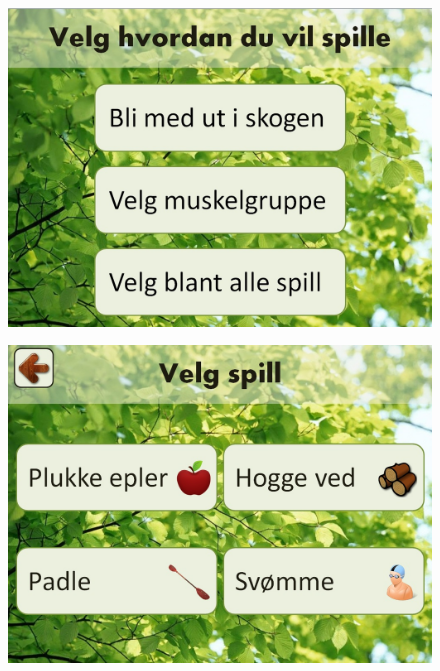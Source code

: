 \begin{figure} [H]
\centering
\includegraphics[scale=0.45]{menuStart.jpg}
\label{fig:menuStartNorsk}
\end{figure} 

\begin{figure} [H]
\centering
\includegraphics[scale=0.4]{VelgSpill.jpg}
\label{velgSpillNorsk}
\end{figure}


